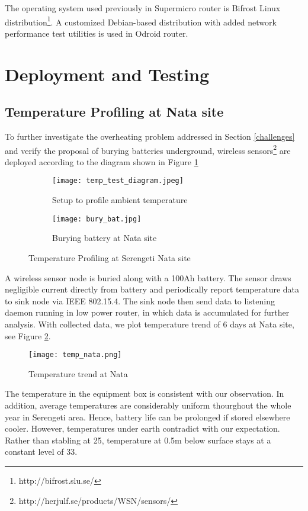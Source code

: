 The operating system used previously in Supermicro router is Bifrost Linux distribution\footnote{http://bifrost.slu.se/}. A customized Debian-based distribution with added network performance test utilities is used in Odroid router.

\section{Deployment and Testing}
\subsection{Temperature Profiling at Nata site}
To further investigate the overheating problem addressed in Section \ref{challenges} and verify the proposal of burying batteries underground, wireless sensors\footnote{http://herjulf.se/products/WSN/sensors/} are deployed according to the diagram shown in Figure \ref{temperature_profile}

\begin{figure}[h]
\centering
\begin{subfigure}{0.45\textwidth}
\centering
\texttt{[image: temp\_test\_diagram.jpeg]}
\caption{Setup to profile ambient temperature}
\end{subfigure}
\begin{subfigure}{0.30\textwidth}
\centering
\texttt{[image: bury\_bat.jpg]}
\caption{Burying battery at Nata site}
\end{subfigure}
\caption{Temperature Profiling at Serengeti Nata site}
\label{temperature_profile}
\end{figure}

A wireless sensor node is buried along with a 100Ah battery. The sensor draws negligible current directly from battery and periodically report temperature data to sink node via IEEE 802.15.4. The sink node then send data to listening daemon running in low power router, in which data is accumulated for further analysis. With collected data, we plot temperature trend of 6 days at Nata site, see Figure \ref{temp_nata}.

\begin{figure}[h]
\centering
\texttt{[image: temp\_nata.png]}
\caption{Temperature trend at Nata}
\label{temp_nata}
\end{figure}

The temperature in the equipment box is consistent with our observation. In addition, average temperatures are considerably uniform thourghout the whole year in Serengeti area. Hence, battery life can be prolonged if stored elsewhere cooler. However, temperatures under earth contradict with our expectation. Rather than stabling at 25\celsius\cite{jager1982soils}, temperature at 0.5m below surface stays at a constant level of 33\celsius. 

